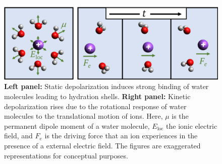 \begin{figure}[t!]
	\centering
	\includegraphics[width=1\figwidth]{chapters/Chapter2_Methods/Graphics/IonicDepolarization.png}
	\caption{\textbf{Left panel:} Static depolarization induces strong binding of water molecules leading to hydration shells. \textbf{Right panel:} Kinetic depolarization rises due to the rotational response of water molecules to the translational motion of ions. Here, $\mu$ is the permanent dipole moment of a water molecule, $E_\text{loc}$ the ionic electric field, and $F_e$ is the driving force that an ion experiences in the presence of a external electric field. The figures are exaggerated representations for conceptual purposes.}
	\label{IonicDepolarization}
\end{figure}

